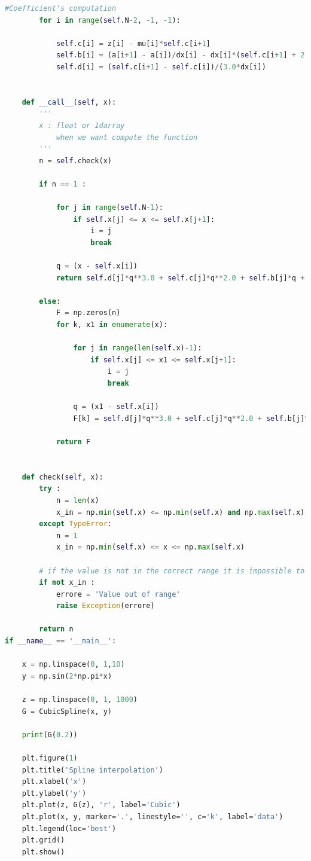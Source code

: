 \documentclass[10pt,a4paper]{article}
\begin{document}
\begin{lstlisting}[language=Python]
        #Coefficient's computation
        for i in range(self.N-2, -1, -1):
            
            self.c[i] = z[i] - mu[i]*self.c[i+1]
            self.b[i] = (a[i+1] - a[i])/dx[i] - dx[i]*(self.c[i+1] + 2.0*self.c[i])/3.0
            self.d[i] = (self.c[i+1] - self.c[i])/(3.0*dx[i])
    
     
    def __call__(self, x):
        '''
        x : float or 1darray
            when we want compute the function
        '''
        n = self.check(x)

        if n == 1 :
            
            for j in range(self.N-1):
                if self.x[j] <= x <= self.x[j+1]:
                    i = j
                    break

            q = (x - self.x[i])
            return self.d[j]*q**3.0 + self.c[j]*q**2.0 + self.b[j]*q + self.y[j]
            
        else:
            F = np.zeros(n)
            for k, x1 in enumerate(x):
                
                for j in range(len(self.x)-1):
                    if self.x[j] <= x1 <= self.x[j+1]:
                        i = j
                        break

                q = (x1 - self.x[i])
                F[k] = self.d[j]*q**3.0 + self.c[j]*q**2.0 + self.b[j]*q + self.y[j]

            return F
        
    
    def check(self, x):
        try :
            n = len(x)
            x_in = np.min(self.x) <= np.min(self.x) and np.max(self.x) >= np.max(x)
        except TypeError:
            n = 1
            x_in = np.min(self.x) <= x <= np.max(self.x)

        # if the value is not in the correct range it is impossible to count
        if not x_in :
            errore = 'Value out of range'
            raise Exception(errore)
        
        return n
if __name__ == '__main__':

    x = np.linspace(0, 1,10)
    y = np.sin(2*np.pi*x)
    
    z = np.linspace(0, 1, 1000)
    G = CubicSpline(x, y)
    
    print(G(0.2))

    plt.figure(1)
    plt.title('Spline interpolation')
    plt.xlabel('x')
    plt.ylabel('y')
    plt.plot(z, G(z), 'r', label='Cubic')
    plt.plot(x, y, marker='.', linestyle='', c='k', label='data')
    plt.legend(loc='best')
    plt.grid()
    plt.show()
    

\end{lstlisting}
\end{document}
